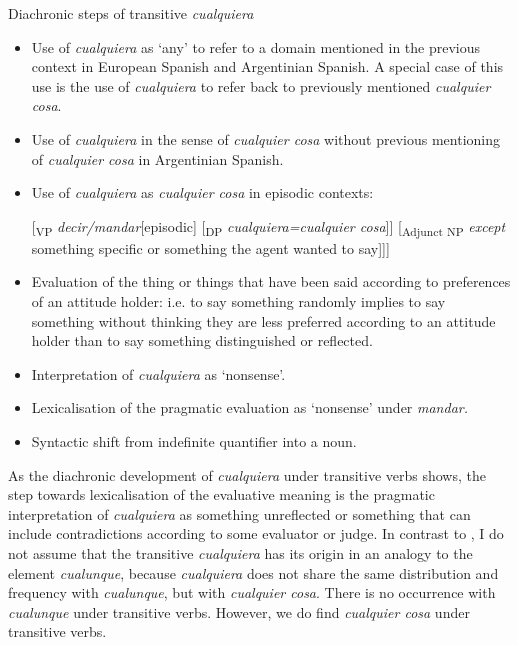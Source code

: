 \ea \label{ex:key:247} %
  Diachronic steps of transitive \textit{cualquiera}
\begin{itemize}
  \item[Step 1:] Use of \textit{cualquiera} as ‘any’ to refer to a domain mentioned in the previous context in European Spanish and Argentinian Spanish. A special case of this use is the use of \textit{cualquiera} to refer back to previously mentioned \textit{cualquier cosa}.

    \item[Step 2:]  Use of \textit{cualquiera} in the sense of \textit{cualquier cosa} without previous mentioning of \textit{cualquier cosa} in Argentinian Spanish.

  \item[Step 3:]  Use of \textit{cualquiera} as \textit{cualquier cosa} in episodic contexts:

[\textsubscript{VP} \textit{decir/mandar}[episodic] [\textsubscript{DP} \textit{cualquiera=cualquier cosa}]] [\textsubscript{Adjunct NP} \textit{except} something specific or something the agent wanted to say]]]

  \item[Step 4:]  Evaluation of the thing or things that have been said according to preferences of an attitude holder: i.e. to say something randomly implies to say something without thinking they are less preferred according to an attitude holder than to say something distinguished or reflected.

  \item[Step 5:]  Interpretation of \textit{cualquiera} as ‘nonsense’.

  \item[Step 6:]  Lexicalisation of the pragmatic evaluation as ‘nonsense’ under \textit{mandar.}

    \item[Step 7:]  Syntactic shift from indefinite quantifier into a noun.
\end{itemize}
\z


As the diachronic development of \textit{cualquiera} under transitive verbs shows, the step towards lexicalisation of the evaluative meaning is the pragmatic interpretation of \textit{cualquiera} as something unreflected or something that can include contradictions according to some evaluator or judge. In contrast to \citet{Rizzosalierno2013}, I do not assume that the transitive \textit{cualquiera} has its origin in an analogy to the element \textit{cualunque}, because \textit{cualquiera} does not share the same distribution and frequency with \textit{cualunque}, but with \textit{cualquier cosa}. There is no occurrence with \textit{cualunque} under transitive verbs. However, we do find \textit{cualquier cosa} under transitive verbs.

